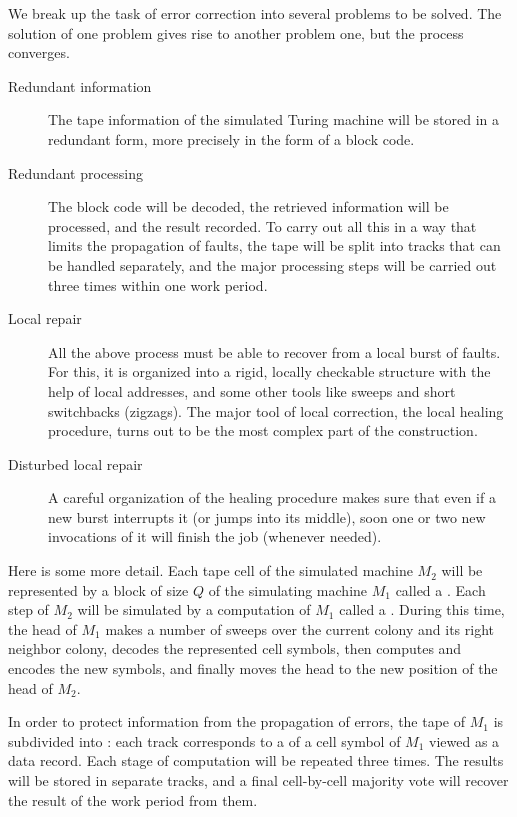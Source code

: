 \documentclass[11pt]{memoir}
\theoremstyle{definition} %
\newcommand{\Q}{Q}
\begin{document}
We break up the task of error correction into several 
problems to be solved.
The solution of one problem gives rise to another problem one, 
but the process converges.
\begin{description}
\item[Redundant information] The tape information of the simulated Turing machine
will be stored in a redundant form, more precisely in the form of a block code.
\item[Redundant processing] The block code will be decoded, the retrieved information 
will be processed, and the result recorded.
To carry out all this in a way that limits the propagation of faults, the tape will be split
into tracks that can be handled separately, and the major processing steps will be 
carried out three times within one work period.
\item[Local repair] All the above process must be able to recover from a local burst of faults.
For this, it is organized into a rigid, locally checkable structure
with the help of local addresses, and some other tools like sweeps and 
short switchbacks (zigzags).
The major tool of local correction, the local healing procedure, turns out to be the most
complex part of the construction.
\item[Disturbed local repair] A careful organization of the healing procedure
makes sure that even if a new burst interrupts it (or jumps into its middle),
soon one or two new invocations of it will finish the job (whenever needed).
\end{description}

Here is some more detail.
Each tape cell of the simulated machine \( M_{2} \) will be represented by a block of
size \( \Q \) of the simulating machine \( M_{1} \) called a .
Each step of \( M_{2} \) will be simulated by a computation of \( M_{1} \) called
a .
During this time, the head of \( M_{1} \) makes a number of sweeps over the
current colony and its right neighbor colony, decodes the represented cell symbols,
then computes and encodes the new symbols, and finally moves the head 
to the new position of the head of \( M_{2} \).

In order to protect information from the propagation of errors,
the tape of \( M_{1} \) is subdivided into : each track corresponds to a 
 of a cell symbol of \( M_{1} \) viewed as a data record.
Each stage of computation will be repeated three times.
The results will be stored in separate tracks, and a final cell-by-cell majority vote
will recover the result of the work period from them.
\end{document}
